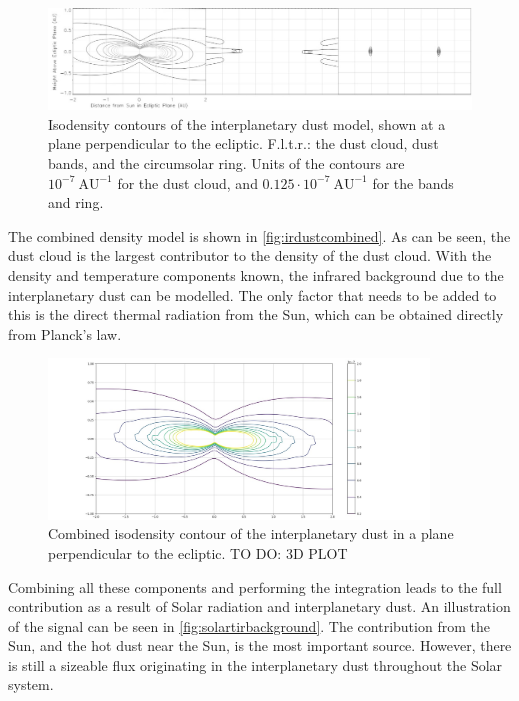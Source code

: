 \begin{figure}[htbp]
 \centering
 \includegraphics[width=1.0\textwidth]{img/ir_dust_components.png}
 \caption{Isodensity contours of the interplanetary dust model, shown at a plane perpendicular to the ecliptic. F.l.t.r.: the dust cloud, dust bands, and the circumsolar ring. Units of the contours are $10^{-7} ~\mathrm{AU}^{-1}$ for the dust cloud, and $0.125\cdot10^{-7} ~\mathrm{AU}^{-1}$ for the bands and ring.}
 \label{fig:irdustcontributions}
\end{figure}

The combined density model is shown in \autoref{fig:irdustcombined}. As can be seen, the dust cloud is the largest contributor to the density of the dust cloud. With the density and temperature components known, the infrared background due to the interplanetary dust can be modelled. The only factor that needs to be added to this is the direct thermal radiation from the Sun, which can be obtained directly from Planck's law. \\

\begin{figure}[htbp]
 \centering
 \includegraphics[width=0.9\textwidth]{img/ir_dust_combined.png}
 \caption{Combined isodensity contour of the interplanetary dust in a plane perpendicular to the ecliptic. TO DO: 3D PLOT}
 \label{fig:irdustcombined}
\end{figure}

Combining all these components and performing the integration leads to the full contribution as a result of Solar radiation and interplanetary dust. An illustration of the signal can be seen in \autoref{fig:solartirbackground}. The contribution from the Sun, and the hot dust near the Sun, is the most important source. However, there is still a sizeable flux originating in the interplanetary dust throughout the Solar system.\\

